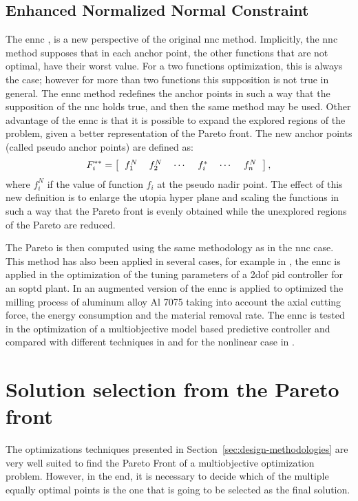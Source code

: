 \subsection{Enhanced Normalized Normal Constraint}
\label{sec:ENNC}
The \gls{ennc} \citet{Sanchis2008}, is a new perspective of the original \gls{nnc} method. Implicitly, the \gls{nnc} method supposes that in each anchor point, the other functions that are not optimal, have their worst value. For a two functions optimization, this is always the case; however for more than two functions this supposition is not true in general. The \gls{ennc} method redefines the anchor points in such a way that the supposition of the \gls{nnc} holds true, and then the same method may be used. Other advantage of the \gls{ennc} is that it is possible to expand the explored regions of the problem, given a better representation of the Pareto front.
%
The new anchor points (called pseudo anchor points) are defined as:
\begin{equation}
F_i^{**} = \left[
\begin{tabular}{cccccc}
$f_1^N$ & $f_2^N$ & $\cdots$ & $f_i^{*}$ & $\cdots$ & $f_n^N$
\end{tabular}
\right],
\label{eq:PseudoAnchor}
\end{equation}
%
where $f_i^N$ if the value of function $f_i$ at the pseudo nadir point. The effect of this new definition is to enlarge the utopia hyper plane and scaling the functions in such a way that the Pareto front is evenly obtained while the unexplored regions of the Pareto are reduced.

The Pareto is then computed using the same methodology as in the \gls{nnc} case. This method has also been applied in several cases, for example in \citet{Contreras-Leiva2016}, the \gls{ennc} is applied in the optimization of the tuning parameters of a \gls{2dof} \gls{pid} controller for an \gls{soptd} plant. In\citet{Pereira2017b} an augmented version of the \gls{ennc} is applied to optimized the milling process of aluminum alloy Al 7075 taking into account the axial cutting force, the energy consumption and the material removal rate. The \gls{ennc} is tested in the optimization of a multiobjective model based predictive controller and compared with different techniques in \citet{Toro2011} and for the nonlinear case in \citet{Vallerio2014}.
\section{Solution selection from the Pareto front}
\label{sec:Selection}
The optimizations techniques presented in Section~\ref{sec:design-methodologies} are very well suited to find the Pareto Front of a multiobjective optimization problem. However, in the end, it is necessary to decide which of the multiple equally optimal points is the one that is going to be selected as the final solution.

